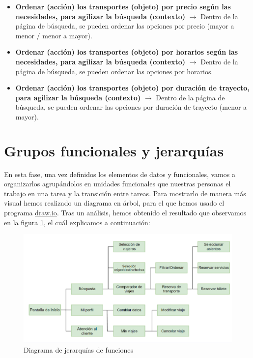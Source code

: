 \begin{itemize}
      \item \textbf{Ordenar (acción) los transportes (objeto) por precio según las necesidades, para agilizar la búsqueda (contexto)} $\rightarrow$ Dentro de la página
            de búsqueda, se pueden ordenar las opciones por precio (mayor a menor / menor a mayor).
      \item \textbf{Ordenar (acción) los transportes (objeto) por horarios según las necesidades, para agilizar la búsqueda (contexto)} $\rightarrow$ Dentro de la página
            de búsqueda, se pueden ordenar las opciones por horarios.
      \item \textbf{Ordenar (acción) los transportes (objeto) por duración de trayecto, para agilizar la búsqueda (contexto)} $\rightarrow$ Dentro de la página de
            búsqueda, se pueden ordenar las opciones por duración de trayecto (menor a mayor).
\end{itemize}

\section{Grupos funcionales y jerarquías}

En esta fase, una vez definidos los elementos de datos y funcionales, vamos a
organizarlos agrupándolos en unidades funcionales que nuestras personas el
trabajo en una tarea y la transición entre tareas. Para mostrarlo de manera más
visual hemos realizado un diagrama en árbol, para el que hemos usado el
programa \underline{\href{https://www.drawio.com/}{draw.io}}. Tras un análisis, 
hemos obtenido el resultado que observamos en la figura \ref{fig:jerarquias}, el cuál explicamos a 
continuación:
\begin{figure}[H]
      \centering
      \includegraphics[width=0.8\linewidth]{./Imagenes/jerarquia.png}
      \caption{Diagrama de jerarquías de funciones}
      \label{fig:jerarquias}
\end{figure}

